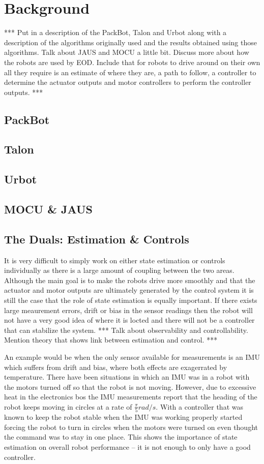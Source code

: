 \chapter{Background}
*** Put in a description of the PackBot, Talon and Urbot along with a description of the algorithms originally used and the results obtained using those algorithms. Talk about JAUS and MOCU a little bit. Discuss more about how the robots are used by EOD. Include that for robots to drive around on their own all they require is an estimate of where they are, a path to follow, a controller to determine the actuator outputs and motor controllers to perform the controller outputs. ***

\section{PackBot}

\section{Talon}

\section{Urbot}

\section{MOCU \& JAUS}

\section{The Duals: Estimation \& Controls}
It is very difficult to simply work on either state estimation or controls individually as there is a large amount of coupling between the two areas. Although the main goal is to make the robots drive more smoothly and that the actuator and motor outputs are ultimately generated by the control system it is still the case that the role of state estimation is equally important. If there exists large meaurement errors, drift or bias in the sensor readings then the robot will not have a very good idea of where it is locted and there will not be a controller that can stabilize the system. *** Talk about observability and controllability. Mention theory that shows link between estimation and control. ***

An example would be when the only sensor available for measurements is an IMU which suffers from drift and bias, where both effects are exagerrated by temperature. There have been situations in which an IMU was in a robot with the motors turned off so that the robot is not moving. However, due to excessive heat in the electronics bos the IMU measurements report that the heading of the robot keeps moving in circles at a rate of $\frac{\pi}{5} rad/s$. With a controller that was known to keep the robot stable when the IMU was working properly started forcing the robot to turn in circles when the motors were turned on even thought the command was to stay in one place. This shows the importance of state estimation on overall robot performance -- it is not enough to only have a good controller.